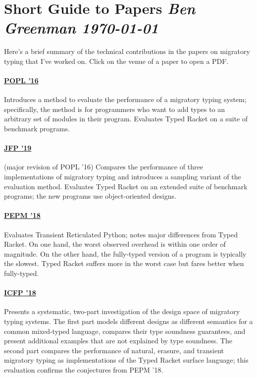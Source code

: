 \documentclass[10pt]{article}
\begin{document}

\nolinenumbers

\section*{Short Guide to Papers \hfill{\normalfont\small\it Ben Greenman \quad \today}}

Here's a brief summary of the technical contributions in the papers on
migratory typing that I've worked on.
Click on the venue of a paper to open a PDF.

\bigskip
\hfill{}\decoone\hfill{}

\paragraph{\href{https://www2.ccs.neu.edu/racket/pubs/popl16-tfgnvf.pdf}{POPL '16}}
Introduces a method to evaluate the performance of a migratory typing system;
specifically, the method is for programmers who want to add types to an
arbitrary set of modules in their program.
Evaluates Typed Racket on a suite of benchmark programs.


\paragraph{\href{https://www2.ccs.neu.edu/racket/pubs/gtnffvf-jfp19.pdf}{JFP '19}}
(major revision of POPL '16) \quad
Compares the performance of three implementations of migratory typing and
introduces a sampling variant of the evaluation method.
Evaluates Typed Racket on an extended suite of benchmark programs; the new programs use
object-oriented designs.


\paragraph{\href{https://www2.ccs.neu.edu/racket/pubs/pepm18-gm.pdf}{PEPM '18}}
Evaluates Transient Reticulated Python; notes major differences from Typed
Racket.
On one hand, the worst observed overhead is within one order of
magnitude.
On the other hand, the fully-typed version of a program is
typically the slowest.
Typed Racket suffers more in the worst case but fares
better when fully-typed.


\paragraph{\href{https://www2.ccs.neu.edu/racket/pubs/icfp18-gf.pdf}{ICFP '18}}
Presents a systematic, two-part investigation of the design space of migratory
typing systems.
The first part models different designs as different semantics
for a common mixed-typed language, compares their type soundness guarantees,
and present additional examples that are not explained by type soundness. The
second part compares the performance of natural, erasure, and transient
migratory typing as implementations of the Typed Racket surface language; this
evaluation confirms the conjectures from PEPM '18.
\end{document}
